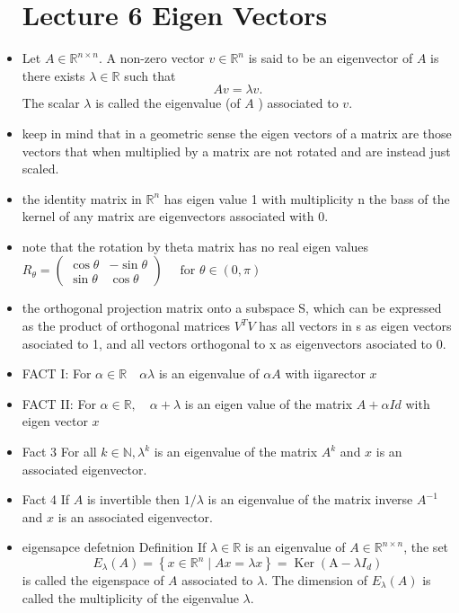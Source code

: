 \documentclass[12pt,twoside]{article}
\begin{document}
\begin{itemize}
\section{Lecture 6 Eigen Vectors }
\item {}Let $A \in \mathbb{R}^{n \times n}$. A non-zero vector $v \in \mathbb{R}^n$ is said to be an eigenvector of $A$ is there exists $\lambda \in \mathbb{R}$ such that
$$
A v=\lambda v .
$$
The scalar $\lambda$ is called the eigenvalue (of $A$ ) associated to $v$.
\item keep in mind that in a geometric sense the eigen vectors of a matrix are those vectors that when multiplied by a matrix are not rotated and are instead just scaled. 
\item the identity matrix in $\mathbb{R}^n$ has eigen value 1 with multiplicity n
\itme the bass  of the kernel of any matrix are eigenvectors associated with 0. 
\item note that the rotation by theta matrix has no real eigen values  $R_\theta=\left(\begin{array}{cc}
\cos \theta & -\sin \theta \\
\sin \theta & \cos \theta
\end{array}\right) \quad \text { for } \theta \in(0, \pi) $
\item the orthogonal projection matrix onto a subspace S, which can be expressed as the product of orthogonal matrices $V^TV$ has all vectors in s as eigen vectors asociated to 1,  and all vectors orthogonal to x as eigenvectors asociated to 0. 
\item FACT I: For $\alpha \in \mathbb{R} \quad \alpha \lambda$ is an eigenvalue of $\alpha A$ with iigarector $x$
\item FACT II: For $\alpha \in \mathbb{R}, \quad \alpha+\lambda$ is an eigen value of the matrix $A+\alpha I d$ with eigen vector $x$
\item Fact 3
For all $k \in \mathbb{N}, \lambda^k$ is an eigenvalue of the matrix $A^k$ and $x$ is an associated eigenvector.
\item Fact 4
If $A$ is invertible then $1 / \lambda$ is an eigenvalue of the matrix inverse $A^{-1}$ and $x$ is an associated eigenvector.
\item eigensapce defetnion Definition
If $\lambda \in \mathbb{R}$ is an eigenvalue of $A \in \mathbb{R}^{n \times n}$, the set
$$
E_\lambda(A)=\left\{x \in \mathbb{R}^n \mid A x=\lambda x\right\}=\operatorname{Ker}\left(\mathrm{A}-\lambda I_d\right)
$$
is called the eigenspace of $A$ associated to $\lambda$. The dimension of $E_\lambda(A)$ is called the multiplicity of the eigenvalue $\lambda$.

\end{itemize}
\end{document}
